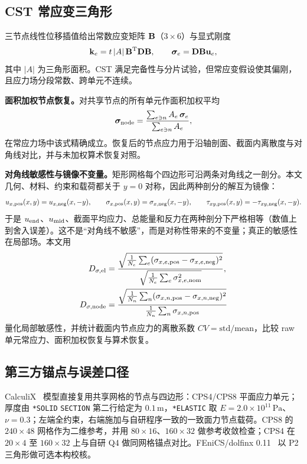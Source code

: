 \subsection{CST 常应变三角形}

三节点线性位移插值给出常数应变矩阵 $\mathbf{B}$（$3\times6$）与显式刚度
\begin{equation}
  \mathbf{k}_e=t\,|A|\,\mathbf{B}^{\mathrm T}\mathbf{D}\mathbf{B},\qquad
  \boldsymbol{\sigma}_e=\mathbf{D}\mathbf{B}\mathbf{u}_e,
  \label{eq:cst}
\end{equation}
其中 $|A|$ 为三角形面积。CST 满足完备性与分片试验，但常应变假设使其偏刚，且应力场分段常数、跨单元不连续。

\textbf{面积加权节点恢复。}对共享节点的所有单元作面积加权平均
\begin{equation}
  \boldsymbol{\sigma}_{\rm node}
  =\frac{\sum_{e\ni n}A_e\,\boldsymbol{\sigma}_e}{\sum_{e\ni n}A_e},
  \label{eq:recovery}
\end{equation}
在常应力场中该式精确成立。恢复后的节点应力用于沿轴剖面、截面内离散度与对角线对比，并与未加权算术恢复对照。

\textbf{对角线敏感性与镜像不变量。}矩形网格每个四边形可沿两条对角线之一剖分。本文几何、材料、约束和载荷都关于 $y=0$ 对称，因此两种剖分的解互为镜像：
\begin{equation}
  u_{x,\rm pos}(x,y)=u_{x,\rm neg}(x,-y),\qquad
  \sigma_{x,\rm pos}(x,y)=\sigma_{x,\rm neg}(x,-y),\qquad
  \tau_{xy,\rm pos}(x,y)=-\tau_{xy,\rm neg}(x,-y).
  \label{eq:mirror}
\end{equation}
于是 $u_{\rm end}$、$u_{\rm mid}$、截面平均应力、总能量和反力在两种剖分下严格相等（数值上到舍入误差）。这不是“对角线不敏感”，而是对称性带来的不变量；真正的敏感性在局部场。本文用
\begin{align}
  D_{\sigma,\rm el}&=\frac{\sqrt{\frac1{N_e}\sum_e(\sigma_{x,e,\rm pos}-\sigma_{x,e,\rm neg})^2}}
                          {\sqrt{\frac1{N_e}\sum_e\sigma_{x,e,\rm nom}^2}},\label{eq:Delem}\\
  D_{\sigma,\rm node}&=\frac{\sqrt{\frac1{N_n}\sum_n(\sigma_{x,n,\rm pos}-\sigma_{x,n,\rm neg})^2}}
                            {\frac1{N_n}\sum_n\sigma_{x,n,\rm pos}}\label{eq:Dnode}
\end{align}
量化局部敏感性，并统计截面内节点应力的离散系数 $CV=\mathrm{std}/\mathrm{mean}$，比较 raw 单元常应力、面积加权恢复与算术恢复。

\subsection{第三方锚点与误差口径}

CalculiX~\cite{dhondt2023} 模型直接复用共享网格的节点与四边形：CPS4/CPS8 平面应力单元；厚度由 \texttt{*SOLID} \texttt{SECTION} 第二行给定为 $0.1\,\mathrm{m}$，\texttt{*ELASTIC} 取 $E=2.0\times10^{11}\,\mathrm{Pa}$、$\nu=0.3$；左端全约束，右端施加与自研程序一致的一致面力节点载荷。CPS8 的 $240\times48$ 网格作为二维参考，并用 $80\times16$、$160\times32$ 做参考收敛检查；CPS4 在 $20\times4$ 至 $160\times32$ 上与自研 Q4 做同网格锚点对比。FEniCS/dolfinx 0.11~\cite{alnaes2015,fenicsx} 以 P2 三角形做可选本构校核。

